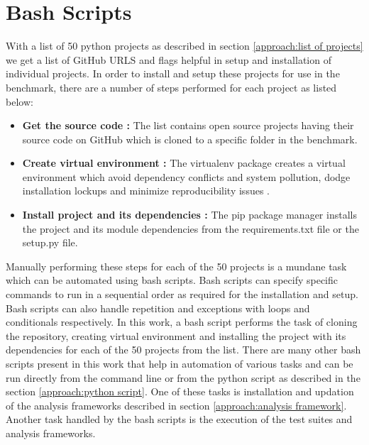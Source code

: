 \section{Bash Scripts}
\label{approach:bash scripts}
With a list of 50 python projects as described in section \ref{approach:list of projects} we get a list of GitHub URLS and flags helpful in setup and installation of individual projects. In order to install and setup these projects for use in the benchmark, there are a number of steps performed for each project as listed below:
\begin{itemize}
    \item \textbf{Get the source code :} The list contains open source projects having their source code on GitHub which is cloned to a specific folder in the benchmark. 
    \item \textbf{Create virtual environment :} The virtualenv \cite{virtualenv} package creates a virtual environment which avoid dependency conflicts and system pollution, dodge installation lockups and minimize reproducibility issues \cite{Why_Virtual_Env}.
    \item \textbf{Install project and its dependencies :} The pip package manager \cite{pip_package_manager} installs the project and its module dependencies from the requirements.txt file or the setup.py file.
\end{itemize}
Manually performing these steps for each of the 50 projects is a mundane task which can be automated using bash scripts. Bash scripts can specify specific commands to run in a sequential order as required for the installation and setup. Bash scripts can also handle repetition and exceptions with loops and conditionals respectively. In this work, a bash script performs the task of cloning the repository, creating virtual environment and installing the project with its dependencies for each of the 50 projects from the list. There are many other bash scripts present in this work that help in automation of various tasks and can be run directly from the command line or from the python script as described in the section \ref{approach:python script}. One of these tasks is installation and updation of the analysis frameworks described in section \ref{approach:analysis framework}. Another task handled by the bash scripts is the execution of the test suites and analysis frameworks.

